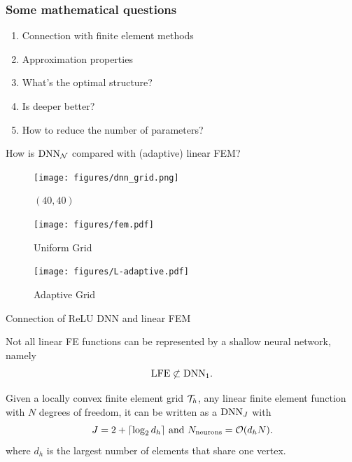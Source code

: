 \documentclass{beamer}
\begin{document}
\begin{CJK*}{UTF8}{gbsn}
\begin{frame}
\frametitle{Some mathematical questions}
\begin{enumerate}
\item Connection with finite element methods 
\item Approximation properties
\item What's the optimal structure?
\item Is deeper better?
\item How to reduce the number of parameters?
\end{enumerate}
\end{frame}


\begin{frame}{How is ${\rm DNN}_{\mathcal N}$ compared with (adaptive) linear FEM?}
\begin{figure}%
\centering
\begin{minipage}[t]{0.3\textwidth}
\centering
\texttt{[image: figures/dnn\_grid.png]} 
\caption{$(40, 40)$}
\end{minipage}
\begin{minipage}[t]{0.3\textwidth}
\centering
\texttt{[image: figures/fem.pdf]}
\caption{Uniform Grid}
\end{minipage}
\begin{minipage}[t]{0.3\textwidth}
\centering
\texttt{[image: figures/L-adaptive.pdf]}
\caption{Adaptive Grid}
\end{minipage}
\end{figure}

\end{frame}

\begin{frame}{Connection of ReLU DNN and linear FEM}
\begin{theorem}
Not all linear FE functions can be represented by a
shallow neural network, namely 
$$
{\rm LFE}\not\subset {\rm DNN}_1.
$$
\end{theorem}

\pause
\begin{theorem}
Given a locally convex finite element grid ${\cal
T}_h$, any linear finite element function with $N$ degrees of
freedom, it can be written as a ${\rm DNN}_J$ with 
$$
J = 2+\lceil\log_2 d_h\rceil
\mbox{ and }
N_{\rm neurons}=\mathcal{O}(d_hN).
$$
where $d_h$ is the largest number of elements that share one vertex.
\end{theorem}


\end{frame}
\end{CJK*}
\end{document}
